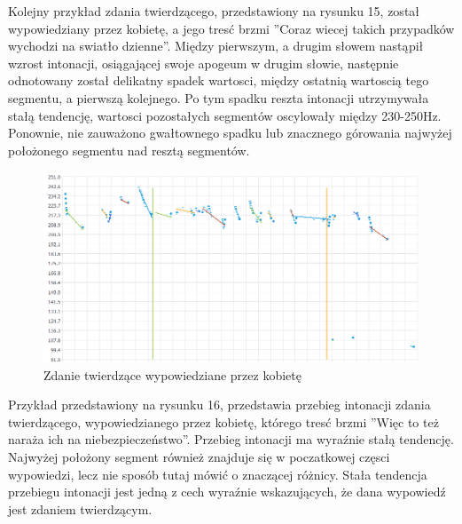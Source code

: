 \documentclass[a4paper,12 pt]{article}
\begin{document}
\FloatBarrier
Kolejny przykład zdania twierdzącego, przedstawiony na rysunku 15, został wypowiedziany przez kobietę, a jego tresć brzmi ''Coraz wiecej takich przypadków wychodzi na swiatło dzienne''. Między pierwszym, a drugim słowem nastąpił wzrost intonacji, osiągającej swoje apogeum w drugim słowie, następnie odnotowany został delikatny spadek wartosci, między ostatnią wartoscią tego segmentu, a pierwszą kolejnego. Po tym spadku reszta intonacji utrzymywała stałą tendencję, wartosci pozostałych segmentów oscylowały między 230-250Hz. Ponownie, nie zauważono gwałtownego spadku lub znacznego górowania najwyżej położonego segmentu nad resztą segmentów.
 \FloatBarrier
\begin{figure}[h]
\centering
\includegraphics[scale=0.7]{twierdzace_narazac.png}
\caption{Zdanie twierdzące wypowiedziane przez kobietę}
\end{figure}
\FloatBarrier
Przykład przedstawiony na rysunku 16, przedstawia przebieg intonacji zdania twierdzącego, wypowiedzianego przez kobietę, którego tresć brzmi ''Więc to też naraża ich na niebezpieczeństwo''. Przebieg intonacji ma wyraźnie stałą tendencję. Najwyżej położony segment również znajduje się w poczatkowej częsci wypowiedzi, lecz nie sposób tutaj mówić o znaczącej różnicy. Stała tendencja przebiegu intonacji jest jedną z cech wyraźnie wskazujących, że dana wypowiedź jest zdaniem twierdzącym.
\end{document}
